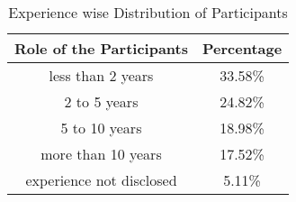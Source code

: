 \begin{table}[t]
\centering
\caption{Experience wise Distribution of Participants}
\begin{tabular}{|c|c|}
\hline
\textbf{Role of the Participants} & \textbf{Percentage}\\
\hline
less than 2 years & 33.58\%\\ 
2 to 5 years & 24.82\%\\ 
5 to 10 years & 18.98\%\\
more than 10 years & 17.52\%\\
experience not disclosed & 5.11\%\\
\hline
\end{tabular}
\label{tab:experience}
\end{table}